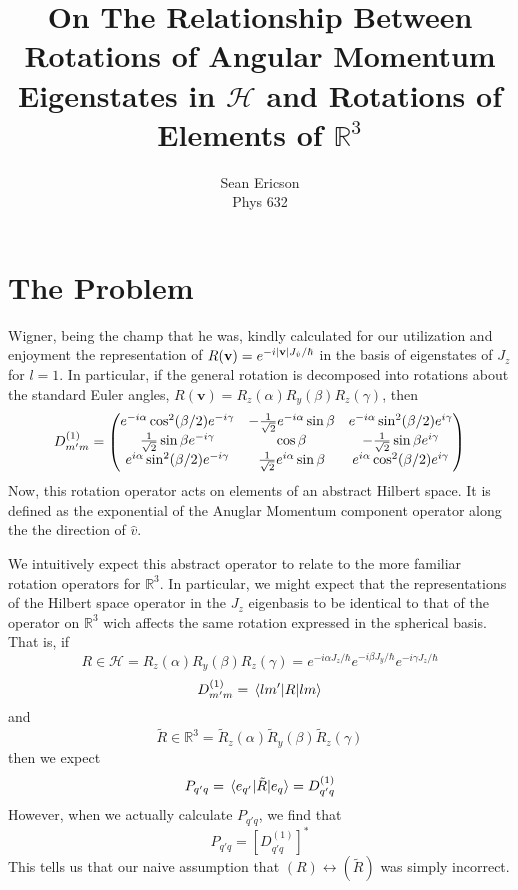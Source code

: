 \documentclass[12pt]{article}
\begin{document}
	
\title{On The Relationship Between Rotations of Angular Momentum Eigenstates in $\mathcal{H}$ and Rotations of Elements of $\mathbb{R}^3$}
\author{Sean Ericson \\ Phys 632}
\maketitle

\section*{The Problem}
Wigner, being the champ that he was, kindly calculated for our utilization and enjoyment the representation of $R(\mathbf{v}) = e^{-i\abs{\mathbf{v}}J_{\hat{v}}/\hbar}$ in the basis of eigenstates of $J_z$ for $l=1$. In particular, if the general rotation is decomposed into rotations about the standard Euler angles, $R(\mathbf{v}) = R_z(\alpha)R_y(\beta)R_z(\gamma)$, then
\[ D_{m'm}^{(1)} = \mqty(e^{-i\alpha}\cos^2(\beta/2)e^{-i\gamma} & -\frac{1}{\sqrt{2}}e^{-i\alpha}\sin\beta & e^{-i\alpha}\sin^2(\beta/2)e^{i\gamma} \\ \frac{1}{\sqrt{2}}\sin\beta e^{-i\gamma} & \cos\beta & -\frac{1}{\sqrt{2}}\sin\beta e^{i\gamma} \\ e^{i\alpha}\sin^2(\beta/2)e^{-i\gamma} & \frac{1}{\sqrt{2}}e^{i\alpha}\sin\beta & e^{i\alpha}\cos^2(\beta/2)e^{i\gamma} )  \]
Now, this rotation operator acts on elements of an abstract Hilbert space. It is defined as the exponential of the Anuglar Momentum component operator along the the direction of $\hat{v}$. 

We intuitively expect this abstract operator to relate to the more familiar rotation operators for $\mathbb{R}^3$. In particular, we might expect that the representations of the Hilbert space operator in the $J_z$ eigenbasis to be identical to that of the operator on $\mathbb{R}^3$ wich affects the same rotation expressed in the spherical basis. That is, if 
\[ R \in \mathcal{H} = R_z(\alpha)R_y(\beta)R_z(\gamma) = e^{-i\alpha J_z/\hbar}e^{-i\beta J_y/\hbar}e^{-i\gamma J_z/\hbar} \]
\[ D_{m'm}^{(1)} = \mel{lm'}{R}{lm} \]
and
\[ \tilde{R} \in \mathbb{R}^3 = \tilde{R}_z(\alpha)\tilde{R}_y(\beta)\tilde{R}_z(\gamma) \]
then we expect
\[ P_{q'q} = \mel{e_{q'}}{\tilde{R}}{e_q} = D_{q'q}^{(1)} \]
However, when we actually calculate $P_{q'q}$, we find that
\[ P_{q'q} = \left[D_{q'q}^{(1)}\right]^* \]
This tells us that our naive assumption that $(R) \leftrightarrow (\tilde{R})$ was simply incorrect.
\end{document}
